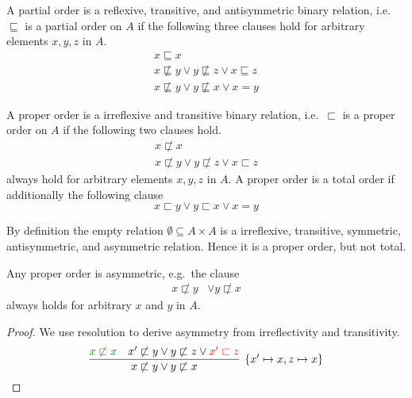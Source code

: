 

\begin{definition}
	A {\myem partial order} is a reflexive, transitive, and antisymmetric binary relation, 
	i.e.~$\sqsubseteq$ is a partial order on $A$ if
	the following three clauses hold for arbitrary elements $x,y,z$ in $A$.
	\begin{align*}
	x\sqsubseteq x
	\tag*{reflexivivity}
	\\
	x\not\sqsubseteq y \lor  y \not\sqsubseteq z \lor x\sqsubseteq z
	\tag*{transitivity}
	\\
	x\not\sqsubseteq y \lor y\not\sqsubseteq x \lor x = y
	\tag*{antisymmetry}
	\end{align*}
\end{definition}

\begin{definition}
	A {\myem proper order} is a irreflexive and transitive binary relation, 
	i.e.~$\sqsubset$ is a proper order on $A$ if the following two clauses hold.
	\begin{align*}
	x\not\sqsubset x
	\tag*{irreflexivivity}
	\\
	x\not\sqsubset y \lor  y \not\sqsubset z \lor x\sqsubset z
	\tag*{transitivity}
	\end{align*}
	always hold for arbitrary elements $x,y,z$ in $A$.
	A proper order is a {\myem total order} if additionally the following clause
	\[
		x \sqsubset y \lor y \sqsubset x  \lor x=y \tag*{totality}
	\]
\end{definition}

\begin{example}
	By definition the empty relation $\emptyset \subseteq A \times A$ is a
	irreflexive,
	transitive,
	symmetric,
	antisymmetric,
	and asymmetric
	relation. 
	Hence it is a proper order, but not total.
\end{example}

\begin{lemma}
	Any proper order is asymmetric, e.g.~the clause
	\begin{align*}
	x\not\sqsubset y &\lor y\not\sqsubset x \tag*{asymmetry}
	\end{align*}
	always holds for arbitrary $x$ and $y$ in $A$.
\end{lemma}

\begin{proof} We use resolution to derive asymmetry from irreflectivity and transitivity.
	\[
			\infer[\{x'\mapsto x, z\mapsto x \}]{
			x\not\sqsubset y \lor y\not\sqsubset x }{
			{\colHi x\not\sqsubset x} & x'\not\sqsubset y \lor  y \not\sqsubset z \lor {\colLo x'\sqsubset z}
		}
	\]
\end{proof}

